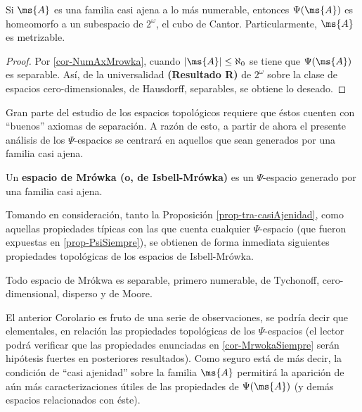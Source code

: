 	\begin{corolario}\label{cor-EncajeMrowkaCantor}
		Si $\ms{A}$ es una familia casi ajena a lo más numerable, entonces $\Psi(\ms{A})$ es homeomorfo a un subespacio de $2^\omega$, el cubo de Cantor. Particularmente, $\ms{A}$ es metrizable.
	\end{corolario}
	
	\begin{proof} 
		Por \ref{cor-NumAxMrowka}, cuando $|\ms{A}|\leq \aleph_0$ se tiene que $\Psi(\ms{A})$ es separable. Así, de la universalidad \textbf{(Resultado R)} de $2^\omega$ sobre la clase de espacios cero-dimensionales, de Hausdorff, separables, se obtiene lo deseado.
	\end{proof}

	Gran parte del estudio de los espacios topológicos requiere que éstos cuenten con ``buenos'' axiomas de separación. A razón de esto, a partir de ahora el presente análisis de los $\Psi$-espacios se centrará en aquellos que sean generados por una familia casi ajena.

	\begin{definicion}
		Un \textbf{espacio de Mrówka (o, de Isbell-Mrówka)} es un $\Psi$-espacio generado por una familia casi ajena.
	\end{definicion}
	
	Tomando en consideración, tanto la Proposición \ref{prop-tra-casiAjenidad}, como aquellas propiedades típicas con las que cuenta cualquier $\Psi$-espacio (que fueron expuestas en \ref{prop-PsiSiempre}), se obtienen de forma inmediata siguientes propiedades topológicas de los espacios de Isbell-Mrówka.
	
	\begin{corolario}\label{cor-MrwokaSiempre}
		Todo espacio de Mrókwa es separable, primero numerable, de Tychonoff, cero-dimensional, disperso y de Moore.
	\end{corolario}
	
	El anterior Corolario es fruto de una serie de observaciones, se podría decir que elementales, en relación las propiedades topológicas de los $\Psi$-espacios (el lector podrá verificar que las propiedades enunciadas en \ref{cor-MrwokaSiempre} serán hipótesis fuertes en posteriores resultados). Como seguro está de más decir, la condición de ``casi ajenidad'' sobre la familia $\ms{A}$ permitirá la aparición de aún más caracterizaciones útiles de las propiedades de $\Psi(\ms{A})$ (y demás espacios relacionados con éste).
	
